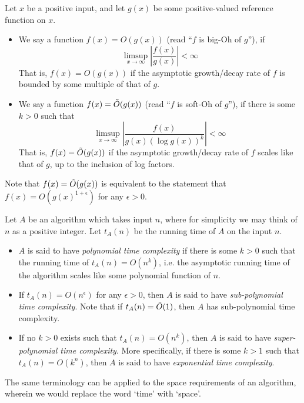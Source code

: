 \begin{definition}
Let $x$ be a positive input, and let $g(x)$ be some positive-valued reference function on $x$.
\begin{itemize}
\item We say a function $f(x) = O(g(x))$ (read ``$f$ is big-Oh of $g$''), if
\begin{equation}
\limsup_{x \to \infty} \left| \frac{f(x)}{g(x)}\right| < \infty
\end{equation}
That is, $f(x) = O(g(x))$ if the asymptotic growth/decay rate of $f$ is bounded by some multiple of that of $g$.
\item We say a function $f(x) = \tilde{O}(g(x))$ (read ``$f$ is soft-Oh of $g$''), if there is some $k>0$ such that
\begin{equation}
\limsup_{x \to \infty} \left| \frac{f(x)}{g(x)\left(\log g(x)\right)^k}\right| < \infty
\end{equation}
That is, $f(x) = \tilde{O}(g(x))$ if the asymptotic growth/decay rate of $f$ scales like that of $g$, up to the inclusion of log factors.
\end{itemize}
\end{definition}
Note that $f(x) = \tilde{O}(g(x))$ is equivalent to the statement that $f(x) = O(g(x)^{1+\epsilon})$ for any $\epsilon>0$. \\

\begin{definition}
Let $A$ be an algorithm which takes input $n$, where for simplicity we may think of $n$ as a positive integer. Let $t_A(n)$ be the running time of $A$ on the input $n$.
\begin{itemize}
\item $A$ is said to have {\it polynomial time complexity} if there is some $k>0$ such that the running time of $t_A(n) = O(n^{k})$, i.e. the asymptotic running time of the algorithm scales like some polynomial function of $n$.
\item If $t_A(n) = O(n^{\epsilon})$ for any $\epsilon>0$, then $A$ is said to have {\it sub-polynomial time complexity}. Note that if $t_A(n) = \tilde{O}(1)$, then $A$ has sub-polynomial time complexity.
\item If no $k>0$ exists such that $t_A(n) = O(n^k)$, then $A$ is said to have {\it super-polynomial time complexity}. More specifically, if there is some $k>1$ such that $t_A(n) = O(k^n)$, then $A$ is said to have {\it exponential time complexity}.
\end{itemize}
\end{definition}
The same terminology can be applied to the space requirements of an algorithm, wherein we would replace the word `time' with `space'.


